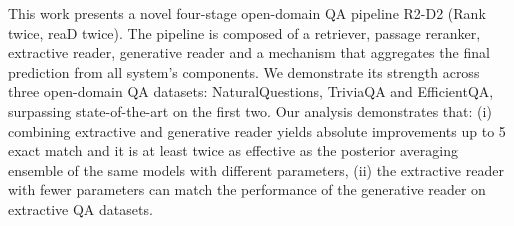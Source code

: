 This work presents a novel four-stage open-domain QA pipeline R2-D2 (Rank twice, reaD twice). The pipeline is composed of a retriever, passage reranker, extractive reader, generative reader and a mechanism that aggregates the final prediction from all system's components. We demonstrate its strength across three open-domain QA datasets: NaturalQuestions, TriviaQA and EfficientQA, surpassing state-of-the-art on the first two. Our analysis demonstrates that: (i) combining extractive and generative reader yields absolute improvements up to 5 exact match and it is at least twice as effective as the posterior averaging ensemble of the same models with different parameters, (ii) the extractive reader with fewer parameters can match the performance of the generative reader on extractive QA datasets.
